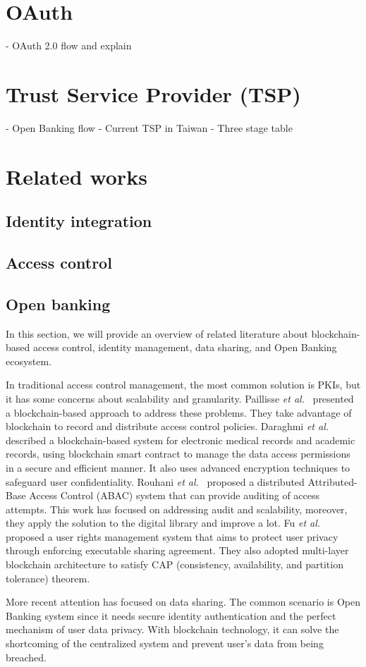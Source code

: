 \newpage

\section{OAuth}
- OAuth 2.0 flow and explain

\newpage

\section{Trust Service Provider (TSP)}
- Open Banking flow
- Current TSP in Taiwan
- Three stage table

\newpage

\section{Related works}

\subsection{Identity integration}
\subsection{Access control}
\subsection{Open banking}
In this section, we will provide an overview of related literature about blockchain-based access control, identity management, data sharing, and Open Banking ecosystem.\par
In traditional access control management, the most common solution is PKIs, but it has some concerns about scalability and granularity. Paillisse \emph{et al.}~\cite{paillisse2019distributed} presented a blockchain-based approach to address these problems. They take advantage of blockchain to record and distribute access control policies. Daraghmi \emph{et al.}~\cite{daraghmi2019medchain,daraghmi2019unichain} described a blockchain-based system for electronic medical records and academic records, using blockchain smart contract to manage the data access permissions in a secure and efficient manner. It also uses advanced encryption techniques to safeguard user confidentiality.
Rouhani \emph{et al.}~\cite{rouhani2020distributed} proposed a distributed Attributed-Base Access Control (ABAC) system that can provide auditing of access attempts. This work has focused on addressing audit and scalability, moreover, they apply the solution to the digital library and improve a lot.
Fu \emph{et al.}~\cite{fu2020soteria} proposed a user rights management system that aims to protect user privacy through enforcing executable sharing agreement. They also adopted multi-layer blockchain architecture to satisfy CAP (consistency, availability, and partition tolerance) theorem.\par

More recent attention has focused on data sharing. The common scenario is Open Banking system since it needs secure identity authentication and the perfect mechanism of user data privacy. With blockchain technology, it can solve the shortcoming of the centralized system and prevent user's data from being breached.